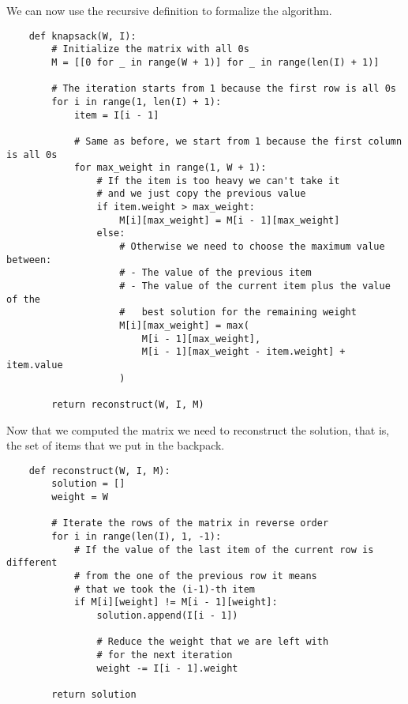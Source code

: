 \documentclass[12pt]{extarticle}
\begin{document}
We can now use the recursive definition to formalize the algorithm.

\begin{verbatim}
    def knapsack(W, I):
        # Initialize the matrix with all 0s
        M = [[0 for _ in range(W + 1)] for _ in range(len(I) + 1)]

        # The iteration starts from 1 because the first row is all 0s
        for i in range(1, len(I) + 1):
            item = I[i - 1]

            # Same as before, we start from 1 because the first column is all 0s
            for max_weight in range(1, W + 1):
                # If the item is too heavy we can't take it
                # and we just copy the previous value
                if item.weight > max_weight:
                    M[i][max_weight] = M[i - 1][max_weight]
                else:
                    # Otherwise we need to choose the maximum value between:
                    # - The value of the previous item
                    # - The value of the current item plus the value of the
                    #   best solution for the remaining weight
                    M[i][max_weight] = max(
                        M[i - 1][max_weight],
                        M[i - 1][max_weight - item.weight] + item.value
                    )

        return reconstruct(W, I, M)
\end{verbatim}

Now that we computed the matrix we need to reconstruct the solution, that is, the set of items that we put in the backpack.

\begin{verbatim}
    def reconstruct(W, I, M):
        solution = []
        weight = W

        # Iterate the rows of the matrix in reverse order
        for i in range(len(I), 1, -1):
            # If the value of the last item of the current row is different
            # from the one of the previous row it means 
            # that we took the (i-1)-th item
            if M[i][weight] != M[i - 1][weight]:
                solution.append(I[i - 1])

                # Reduce the weight that we are left with
                # for the next iteration
                weight -= I[i - 1].weight
        
        return solution
\end{verbatim}

\end{document}
